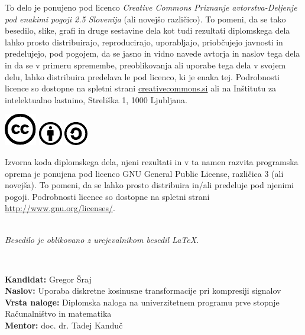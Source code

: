 \documentclass[a4paper,12pt,openright]{book}
\newcommand{\clearemptydoublepage}{\newpage{\pagestyle{empty}\cleardoublepage}}
\newcommand{\CcImageCc}[1]{%
	\includegraphics[scale=#1]{slike/cc_cc_30.pdf}%
}
\newcommand{\CcImageBy}[1]{%
	\includegraphics[scale=#1]{slike/cc_by_30.pdf}%
}
\newcommand{\CcImageSa}[1]{%
	\includegraphics[scale=#1]{slike/cc_sa_30.pdf}%
}
\begin{document}
\newpage
\thispagestyle{empty}

\vspace*{5cm}
{\small \noindent
To delo je ponujeno pod licenco \textit{Creative Commons Priznanje avtorstva-Deljenje pod enakimi pogoji 2.5 Slovenija} (ali novej\v so razli\v cico).
To pomeni, da se tako besedilo, slike, grafi in druge sestavine dela kot tudi rezultati diplomskega dela lahko prosto distribuirajo,
reproducirajo, uporabljajo, priobčujejo javnosti in predelujejo, pod pogojem, da se jasno in vidno navede avtorja in naslov tega
dela in da se v primeru spremembe, preoblikovanja ali uporabe tega dela v svojem delu, lahko distribuira predelava le pod
licenco, ki je enaka tej.
Podrobnosti licence so dostopne na spletni strani \href{http://creativecommons.si}{creativecommons.si} ali na Inštitutu za
intelektualno lastnino, Streliška 1, 1000 Ljubljana.

\vspace*{1cm}
\begin{center}%
\CcImageCc{0.741573033707865}\hspace*{1ex}\CcImageBy{1}\hspace*{1ex}\CcImageSa{1}%
\end{center}
}

\vspace*{1cm}
{\small \noindent
Izvorna koda diplomskega dela, njeni rezultati in v ta namen razvita programska oprema je ponujena pod licenco GNU General Public License,
različica 3 (ali novejša). To pomeni, da se lahko prosto distribuira in/ali predeluje pod njenimi pogoji.
Podrobnosti licence so dostopne na spletni strani \url{http://www.gnu.org/licenses/}.
}

\vfill
\begin{center} 
\ \\ \vfill
{\em
Besedilo je oblikovano z urejevalnikom besedil \LaTeX.}
\end{center}

\clearemptydoublepage

\thispagestyle{empty}
\
\vfill

\bigskip
\noindent\textbf{Kandidat:} Gregor Šraj\\
\noindent\textbf{Naslov:} Uporaba diskretne kosinusne transformacije pri kompresiji signalov\\
\noindent\textbf{Vrsta naloge:} Diplomska naloga na univerzitetnem programu prve stopnje Računalništvo in matematika \\
\noindent\textbf{Mentor:} doc. dr. Tadej Kanduč\\
\end{document}
